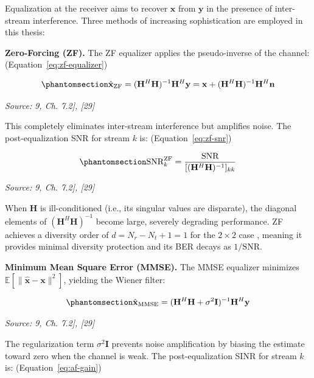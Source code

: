 Equalization at the receiver aims to recover \(\mathbf{x}\) from \(\mathbf{y}\) in the presence of inter-stream interference. Three methods of increasing sophistication are employed in this thesis:

\textbf{Zero-Forcing (ZF).} The ZF equalizer applies the pseudo-inverse of the channel: (Equation~\ref{eq:zf-equalizer})

\begin{equation}\protect\phantomsection\label{eq:zf-equalizer}{\hat{\mathbf{x}}_{\text{ZF}} = (\mathbf{H}^H\mathbf{H})^{-1}\mathbf{H}^H\mathbf{y} = \mathbf{x} + (\mathbf{H}^H\mathbf{H})^{-1}\mathbf{H}^H\mathbf{n}
}\end{equation} \par{\small\textit{Source: \cite{Laneman2004CooperativeDiversity}9, Ch. 7.2], [29]}}

This completely eliminates inter-stream interference but amplifies noise. The post-equalization SNR for stream \(k\) is: (Equation~\ref{eq:zf-snr})

\begin{equation}\protect\phantomsection\label{eq:zf-snr}{\text{SNR}_k^{\text{ZF}} = \frac{\text{SNR}}{[(\mathbf{H}^H\mathbf{H})^{-1}]_{kk}}
}\end{equation} \par{\small\textit{Source: \cite{Laneman2004CooperativeDiversity}9, Ch. 7.2], [29]}}

When \(\mathbf{H}\) is ill-conditioned (i.e., its singular values are disparate), the diagonal elements of \((\mathbf{H}^H\mathbf{H})^{-1}\) become large, severely degrading performance. ZF achieves a diversity order of \(d = N_r - N_t + 1 = 1\) for the \(2 \times 2\) case \cite{TseViswanath2005Fundamentals}, meaning it provides minimal diversity protection and its BER decays as \(1/\text{SNR}\).

\textbf{Minimum Mean Square Error (MMSE).} The MMSE equalizer minimizes \(\mathbb{E}[\|\hat{\mathbf{x}} - \mathbf{x}\|^2]\), yielding the Wiener filter:

\begin{equation}\protect\phantomsection\label{eq:mmse-equalizer}{\hat{\mathbf{x}}_{\text{MMSE}} = (\mathbf{H}^H\mathbf{H} + \sigma^2\mathbf{I})^{-1}\mathbf{H}^H\mathbf{y}
}\end{equation} \par{\small\textit{Source: \cite{Laneman2004CooperativeDiversity}9, Ch. 7.2], [29]}}

The regularization term \(\sigma^2\mathbf{I}\) prevents noise amplification by biasing the estimate toward zero when the channel is weak. The post-equalization SINR for stream \(k\) is: (Equation~\ref{eq:af-gain})

